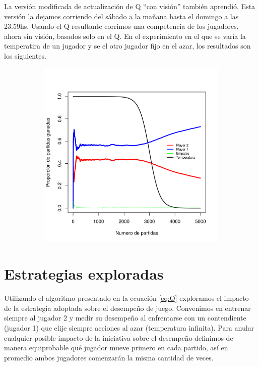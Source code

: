 \documentclass[11pt, spanish]{article}
\begin{document}
La versi\'on modificada de actualizaci\'on de Q ``con visi\'on'' tambi\'en aprendi\'o. Esta versi\'on la dejamos corriendo del s\'abado a la ma\~nana hasta el domingo a las 23.59hs. Usando el Q resultante corrimos una competencia de los jugadores, ahora sin visi\'on, basados solo en el Q. En el experimiento en el que se var\'ia la temperatira de un jugador y se el otro jugador fijo en el azar, los resultados son los siguientes. 

\begin{figure}[H]
    \centering
    \begin{subfigure}[b]{0.45\textwidth}
      \includegraphics[width=\textwidth]{Imagenes/SinVision_disipacion_QconVison}
    \end{subfigure}
\end{figure}


\section{Estrategias exploradas}
\par Utilizando el algoritmo presentado en la ecuación \ref{eq:Q} exploramos 
el impacto de la estrategia adoptada sobre el desempeño de juego. Convenimos en 
entrenar siempre al jugador 2 y medir su desempeño al enfrentarse con un 
contendiente (jugador 1) que elije siempre acciones al azar (temperatura 
infinita). Para anular cualquier posible impacto de la iniciativa sobre el 
desempeño definimos de manera equiprobable qué jugador mueve primero en cada 
partido, así en promedio ambos jugadores comenzarán la misma cantidad de veces.
\end{document}
